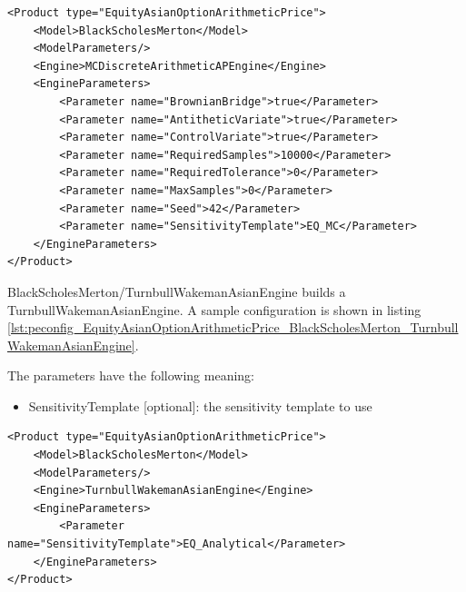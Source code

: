 \begin{longlisting}
\begin{verbatim}
<Product type="EquityAsianOptionArithmeticPrice">
    <Model>BlackScholesMerton</Model>
    <ModelParameters/>
    <Engine>MCDiscreteArithmeticAPEngine</Engine>
    <EngineParameters>
        <Parameter name="BrownianBridge">true</Parameter>
        <Parameter name="AntitheticVariate">true</Parameter>
        <Parameter name="ControlVariate">true</Parameter>
        <Parameter name="RequiredSamples">10000</Parameter>
        <Parameter name="RequiredTolerance">0</Parameter>
        <Parameter name="MaxSamples">0</Parameter>
        <Parameter name="Seed">42</Parameter>
        <Parameter name="SensitivityTemplate">EQ_MC</Parameter>
    </EngineParameters>
</Product>
\end{verbatim}
\caption{Configuration for Product EquityAsianOptionArithmeticPrice, Model BlackScholesMerton, Engine MCDiscreteArithmeticAPEngine}
\label{lst:peconfig_EquityAsianOptionArithmeticPrice_BlackScholesMerton_MCDiscreteArithmeticAPEngine}
\end{longlisting}

BlackScholesMerton/TurnbullWakemanAsianEngine builds a TurnbullWakemanAsianEngine. A sample configuration is shown in
listing \ref{lst:peconfig_EquityAsianOptionArithmeticPrice_BlackScholesMerton_TurnbullWakemanAsianEngine}.

The parameters have the following meaning:

\begin{itemize}
\item SensitivityTemplate [optional]: the sensitivity template to use
\end{itemize}

\begin{longlisting}
\begin{verbatim}
<Product type="EquityAsianOptionArithmeticPrice">
    <Model>BlackScholesMerton</Model>
    <ModelParameters/>
    <Engine>TurnbullWakemanAsianEngine</Engine>
    <EngineParameters>
        <Parameter name="SensitivityTemplate">EQ_Analytical</Parameter>
    </EngineParameters>
</Product>
\end{verbatim}
\caption{Configuration for Product EquityAsianOptionArithmeticPrice, Model BlackScholesMerton, Engine TurnbullWakemanAsianEngine}
\label{lst:peconfig_EquityAsianOptionArithmeticPrice_BlackScholesMerton_TurnbullWakemanAsianEngine}
\end{longlisting}

